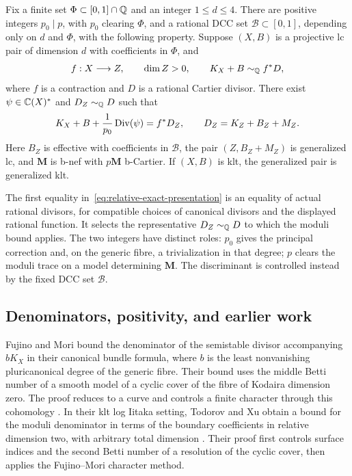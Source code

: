 \begin{theorem}\label{thm:relative-denominators}
Fix a finite set $\Phi\subset[0,1]\cap\mathbb Q$ and an integer $1\leq d\leq4$.
There are positive integers $p_0\mid p$, with $p_0$ clearing $\Phi$, and a
rational DCC set $\mathcal B\subset[0,1]$, depending only on $d$ and
$\Phi$, with the following property. Suppose $(X,B)$ is a projective lc
pair of dimension $d$ with coefficients in $\Phi$, and
\[
 f:X\longrightarrow Z,\qquad \dim Z>0,\qquad K_X+B\sim_\mathbb Q f^*D,
\]
where $f$ is a contraction and $D$ is a rational Cartier divisor. There
exist $\psi\in\mathbb C(X)^*$ and $D_Z\sim_\mathbb Q D$ such that
\begin{equation}\label{eq:relative-exact-presentation}
 K_X+B+\frac{1}{p_0}\operatorname{Div}(\psi)=f^*D_Z,
 \qquad D_Z=K_Z+B_Z+M_Z.
\end{equation}
Here $B_Z$ is effective with coefficients in $\mathcal B$, the pair
$(Z,B_Z+M_Z)$ is generalized lc, and $\mathbf M$ is b-nef with
$p\mathbf M$ b-Cartier. If $(X,B)$ is klt, the generalized pair is
generalized klt.
\end{theorem}

The first equality in~\eqref{eq:relative-exact-presentation} is an
equality of actual rational divisors, for compatible choices of canonical
divisors and the displayed rational function.  It selects the
representative $D_Z\sim_\mathbb Q D$ to which the moduli bound applies.  The two
integers have distinct roles: $p_0$ gives the principal correction and,
on the generic fibre, a trivialization in that degree; $p$ clears the
moduli trace on a model determining $\mathbf M$.  The discriminant is
controlled instead by the fixed DCC set $\mathcal B$.

\subsection{Denominators, positivity, and earlier work}

Fujino and Mori bound the denominator of the semistable divisor
accompanying $bK_X$ in their canonical bundle formula, where $b$ is the
least nonvanishing pluricanonical degree of the generic fibre.  Their
bound uses the middle Betti number of a smooth model of a cyclic cover of
the fibre of Kodaira dimension zero.  The proof reduces to a curve and
controls a finite character through this cohomology
\cite[Theorem~3.1 and Sections~3.3, 3.6--3.8]{FujinoMori2000}.  In their klt log Iitaka
setting, Todorov and Xu obtain a bound for the moduli denominator in terms
of the boundary coefficients in relative dimension two, with arbitrary
total dimension \cite[Theorem~1.3]{TodorovXu2009}.  Their proof first
controls surface indices and the second Betti number of a resolution of
the cyclic cover, then applies the Fujino--Mori character method.

